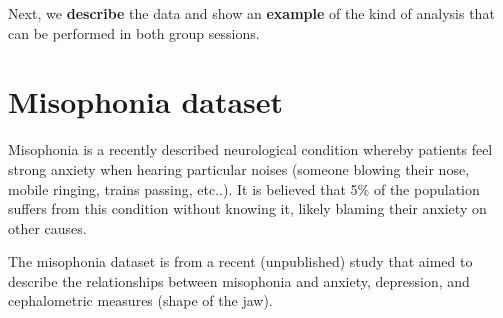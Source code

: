 \documentclass[
]{book}
\begin{document}
Next, we \textbf{describe} the data and show an \textbf{example} of the kind of analysis that can be performed in both group sessions.

\hypertarget{misophonia-dataset}{%
\section{Misophonia dataset}\label{misophonia-dataset}}

Misophonia is a recently described neurological condition whereby patients feel strong anxiety when hearing particular noises (someone blowing their nose, mobile ringing, trains passing, etc..). It is believed that 5\% of the population suffers from this condition without knowing it, likely blaming their anxiety on other causes.

The misophonia dataset is from a recent (unpublished) study that aimed to describe the relationships between misophonia and anxiety, depression, and cephalometric measures (shape of the jaw).
\end{document}
